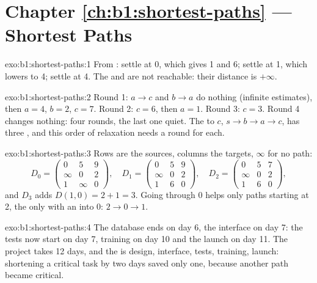 \section*{Chapter \ref{ch:b1:shortest-paths} --- Shortest Paths}

\begin{solution}{exo:b1:shortest-paths:1}
From : settle  at 0, which gives  1 and  6; settle  at 1, which lowers  to
4; settle  at 4. The   and  are not reachable: their distance is $+\infty$.
\end{solution}

\begin{solution}{exo:b1:shortest-paths:2}
Round 1: $a \to c$ and $b \to a$ do nothing (infinite estimates), then $a = 4$, $b = 2$, $c = 7$. Round 2: $c = 6$, then
$a = 1$. Round 3: $c = 3$. Round 4 changes nothing: four rounds, the last one quiet. The  to $c$, $s \to
b \to a \to c$, has three , and this order of relaxation needs a round for each.
\end{solution}

\begin{solution}{exo:b1:shortest-paths:3}
Rows are the sources, columns the targets, $\infty$ for no path:
\[ D_0 = \begin{pmatrix} 0 & 5 & 9 \\ \infty & 0 & 2 \\ 1 & \infty & 0 \end{pmatrix},\quad
D_1 = \begin{pmatrix} 0 & 5 & 9 \\ \infty & 0 & 2 \\ 1 & 6 & 0 \end{pmatrix},\quad
D_2 = \begin{pmatrix} 0 & 5 & 7 \\ \infty & 0 & 2 \\ 1 & 6 & 0 \end{pmatrix}, \]
and $D_3$ adds $D(1, 0) = 2 + 1 = 3$. Going through 0 helps only paths starting at 2, the only  with an  into 0: $2 \to 0 \to 1$.
\end{solution}

\begin{solution}{exo:b1:shortest-paths:4}
The database ends on day 6, the interface on day 7: the tests now start on day 7, training on day 10 and the launch on
day 11. The project takes 12 days, and the  is design, interface, tests, training, launch: shortening a
critical task by two days saved only one, because another path became critical.
\end{solution}


